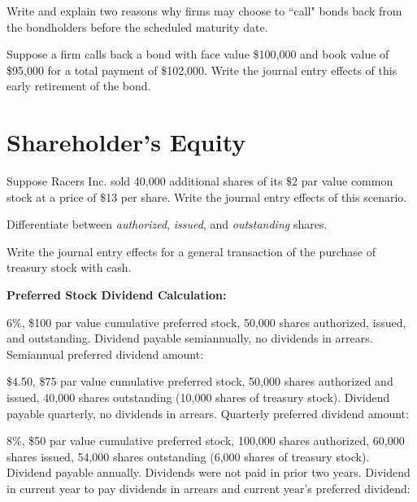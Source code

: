 \documentclass{scrartcl}
\begin{document}
Write and explain two reasons why firms may choose to ``call" bonds
back from the bondholders before the scheduled maturity date.

\vspace{10em}

Suppose a firm calls back a bond with face value \$100,000 and book
value of \$95,000 for a total payment of \$102,000. Write the journal
entry effects of this early retirement of the bond.

\vspace{10em}

\section{Shareholder's Equity}

Suppose Racers Inc. sold 40,000 additional shares of its \$2 par value
common stock at a price of \$13 per share. Write the journal entry
effects of this scenario.

\vspace{10em}

Differentiate between \textit{authorized}, \textit{issued}, and 
\textit{outstanding} shares.

\vspace{10em}

Write the journal entry effects for a general transaction of the 
purchase of treasury stock with cash.

\vspace{10em}

\textbf{Preferred Stock Dividend Calculation:}

\medskip

6\%, \$100 par value cumulative preferred stock, 50,000 shares 
authorized, issued, and outstanding. Dividend payable semiannually,
no dividends in arrears. Semiannual preferred dividend amount:

\vspace{5em}

\$4.50, \$75 par value cumulative preferred stock, 50,000 shares 
authorized and issued, 40,000 shares outstanding (10,000 shares of
treasury stock). Dividend payable quarterly, no dividends in arrears.
Quarterly preferred dividend amount:

\vspace{5em}

8\%, \$50 par value cumulative preferred stock, 100,000 shares 
authorized, 60,000 shares issued, 54,000 shares outstanding (6,000
shares of treasury stock). Dividend payable annually. Dividends were
not paid in prior two years. Dividend in current year to pay dividends
in arrears and current year's preferred dividend: 
\end{document}
